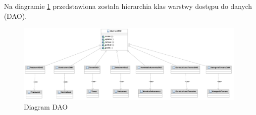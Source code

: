 Na diagramie \ref{fig:DiagramDAO} przedstawiona została hierarchia klas warstwy dostępu do danych (DAO).
\begin{figure}[!htb]
  \begin{center}
    \includegraphics[scale=0.4]{../img/model/diagram_dao.pdf}
  \end{center}
  \caption{Diagram DAO}
  \label{fig:DiagramDAO}
\end{figure}
\FloatBarrier